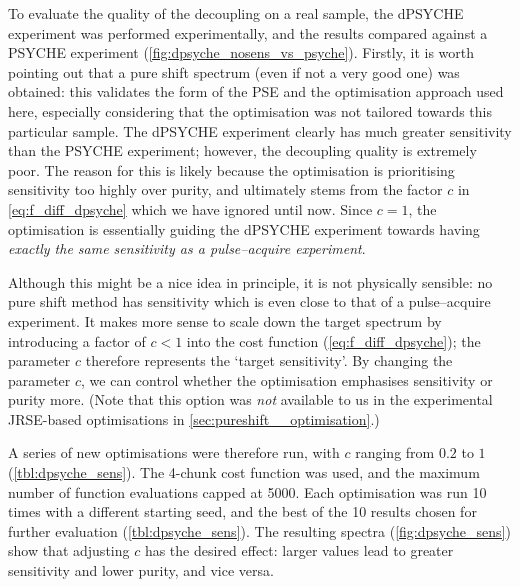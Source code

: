 To evaluate the quality of the decoupling on a real sample, the dPSYCHE experiment was performed experimentally, and the results compared against a PSYCHE experiment (\cref{fig:dpsyche_nosens_vs_psyche}).
Firstly, it is worth pointing out that a pure shift spectrum (even if not a very good one) was obtained: this validates the form of the PSE and the optimisation approach used here, especially considering that the optimisation was not tailored towards this particular sample.
The dPSYCHE experiment clearly has much greater sensitivity than the PSYCHE experiment; however, the decoupling quality is extremely poor.
The reason for this is likely because the optimisation is prioritising sensitivity too highly over purity, and ultimately stems from the factor $c$ in \cref{eq:f_diff_dpsyche} which we have ignored until now.
Since $c = 1$, the optimisation is essentially guiding the dPSYCHE experiment towards having \textit{exactly the same sensitivity as a pulse--acquire experiment}.

Although this might be a nice idea in principle, it is not physically sensible: no pure shift method has sensitivity which is even close to that of a pulse--acquire experiment.
It makes more sense to scale down the target spectrum by introducing a factor of $c < 1$ into the cost function (\cref{eq:f_diff_dpsyche}); the parameter $c$ therefore represents the `target sensitivity'.
By changing the parameter $c$, we can control whether the optimisation emphasises sensitivity or purity more.
(Note that this option was \textit{not} available to us in the experimental JRSE-based optimisations in \cref{sec:pureshift__optimisation}.)

A series of new optimisations were therefore run, with $c$ ranging from $0.2$ to $1$ (\cref{tbl:dpsyche_sens}).
The 4-chunk cost function was used, and the maximum number of function evaluations capped at 5000.
Each optimisation was run 10 times with a different starting seed, and the best of the 10 results chosen for further evaluation (\cref{tbl:dpsyche_sens}).
The resulting spectra (\cref{fig:dpsyche_sens}) show that adjusting $c$ has the desired effect: larger values lead to greater sensitivity and lower purity, and vice versa.

